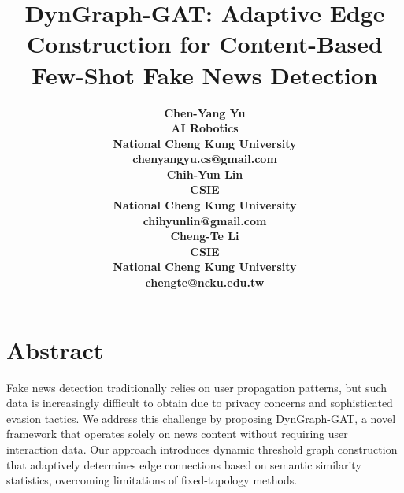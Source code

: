 \documentclass[conference]{IEEEtran}
\begin{document}
\title{DynGraph-GAT: Adaptive Edge Construction for Content-Based Few-Shot Fake News Detection}

\author{
\begin{minipage}[t]{0.3\textwidth}
\centering
{\fontsize{12}{14}\selectfont\normalfont\textbf{Chen-Yang Yu}}\\
{\fontsize{12}{14}\selectfont\textbf{AI Robotics}}\\
{\fontsize{12}{14}\selectfont\textbf{National Cheng Kung University}}\\
{\fontsize{12}{14}\selectfont\textbf{chenyangyu.cs@gmail.com}}
\end{minipage}
\hfill
\begin{minipage}[t]{0.3\textwidth}
\centering
{\fontsize{12}{14}\selectfont\normalfont\textbf{Chih-Yun Lin}}\\
{\fontsize{12}{14}\selectfont\textbf{CSIE}}\\
{\fontsize{12}{14}\selectfont\textbf{National Cheng Kung University}}\\
{\fontsize{12}{14}\selectfont\textbf{chihyunlin@gmail.com}}
\end{minipage}
\hfill
\begin{minipage}[t]{0.3\textwidth}
\centering
{\fontsize{12}{14}\selectfont\normalfont\textbf{Cheng-Te Li}}\\
{\fontsize{12}{14}\selectfont\textbf{CSIE}}\\
{\fontsize{12}{14}\selectfont\textbf{National Cheng Kung University}}\\
{\fontsize{12}{14}\selectfont\textbf{chengte@ncku.edu.tw}}
\end{minipage}
}


\maketitle

\section*{Abstract}
    \label{sec:abstract}
    Fake news detection traditionally relies on user propagation patterns, but such data is increasingly difficult to obtain due to privacy concerns and sophisticated evasion tactics. We address this challenge by proposing DynGraph-GAT, a novel framework that operates solely on news content without requiring user interaction data. Our approach introduces dynamic threshold graph construction that adaptively determines edge connections based on semantic similarity statistics, overcoming limitations of fixed-topology methods. 
    
\end{document}
